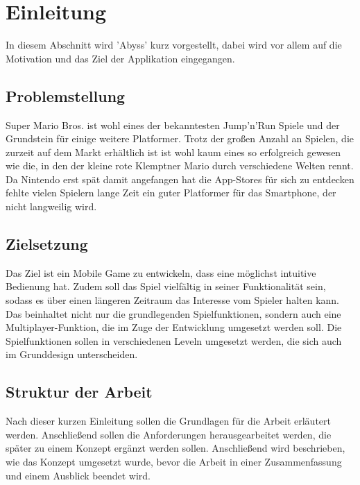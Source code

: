 \chapter{Einleitung}
\label{cha:einleitung}
In diesem Abschnitt wird 'Abyss' kurz vorgestellt, dabei wird vor allem auf 
die Motivation und das Ziel der Applikation eingegangen.

\section{Problemstellung}
\label{sec:einleitung:problemstellung}
Super Mario Bros. \cite{mario} ist wohl eines der bekanntesten Jump'n'Run Spiele und
der Grundstein für einige weitere Platformer. Trotz der großen Anzahl an Spielen,
die zurzeit auf dem Markt erhältlich ist ist wohl kaum eines so erfolgreich gewesen
wie die, in den der kleine rote Klemptner Mario durch verschiedene Welten rennt. \newline
Da Nintendo erst spät damit angefangen hat die App-Stores für sich zu entdecken 
fehlte vielen Spielern lange Zeit ein guter Platformer für das Smartphone, 
der nicht langweilig wird.


\section{Zielsetzung}
\label{sec:einleitung:zielsetzung}
Das Ziel ist ein Mobile Game zu entwickeln, dass eine möglichst intuitive Bedienung
hat. Zudem soll das Spiel vielfältig in seiner Funktionalität sein, sodass es 
über einen längeren Zeitraum das Interesse vom Spieler halten kann. \newline
Das beinhaltet nicht nur die grundlegenden Spielfunktionen, sondern auch eine 
Multiplayer-Funktion, die im Zuge der Entwicklung umgesetzt werden soll. 
Die Spielfunktionen sollen in verschiedenen Leveln umgesetzt werden, die sich 
auch im Grunddesign unterscheiden.

\section{Struktur der Arbeit}
\label{sec:einleitung:struktur}
Nach dieser kurzen Einleitung sollen die Grundlagen für die Arbeit erläutert werden.
Anschließend sollen die Anforderungen herausgearbeitet werden, die später zu einem Konzept 
ergänzt werden sollen. Anschließend wird beschrieben, wie das Konzept umgesetzt wurde, bevor
die Arbeit in einer Zusammenfassung und einem Ausblick beendet wird.